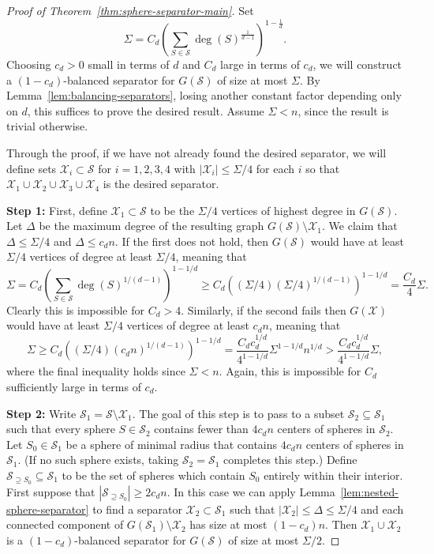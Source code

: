 \documentclass[10pt,a4paper]{amsart}
\newcommand{\fS}{\mathcal S}
\newcommand{\fX}{\mathcal X}
\newcommand{\paren}[1]{\left( #1 \right)}
\begin{document}
\begin{proof}[Proof of Theorem~\ref{thm:sphere-separator-main}]
Set \[\Sigma=C_d\paren{\sum_{S\in\fS} \deg(S)^{\tfrac1{d-1}}}^{1-\tfrac1d}.\] Choosing $c_d>0$ small in terms of $d$ and $C_d$ large in terms of $c_d$, we will construct a $(1-c_d)$-balanced separator for $G(\fS)$ of size at most $\Sigma$. By Lemma~\ref{lem:balancing-separators}, losing another constant factor depending only on $d$, this suffices to prove the desired result. Assume $\Sigma<n$, since the result is trivial otherwise.

Through the proof, if we have not already found the desired separator, we will define sets $\fX_i \subset \fS$ for $i=1,2,3,4$ with $|\fX_i| \leq \Sigma/4$ for each $i$ so that $\fX_1\cup \fX_2\cup \fX_3\cup \fX_4$ is the desired separator.

\vspace{5pt} \noindent \textbf{Step 1:}
First, define $\fX_1\subset \fS$ to be the $\Sigma/4$ vertices of highest degree in $G(\fS)$. Let $\Delta$ be the maximum degree of the resulting graph $G(\fS)\setminus\fX_1$. We claim that $\Delta\leq\Sigma/4$ and $\Delta\leq c_dn$. If the first does not hold, then $G(\fS)$ would have at least $\Sigma/4$ vertices of degree at least $\Sigma/4$, meaning that
\[\Sigma=C_d\paren{\sum_{S\in\fS} \deg(S)^{1/(d-1)}}^{1-1/d}\geq C_d\paren{(\Sigma/4)(\Sigma/4)^{1/(d-1)}}^{1-1/d}=\frac{C_d}4\Sigma.\]
Clearly this is impossible for $C_d>4$. Similarly, if the second fails then $G(\fX)$ would have at least $\Sigma/4$ vertices of degree at least $c_dn$, meaning that
\[\Sigma\geq C_d\paren{(\Sigma/4)(c_dn)^{1/(d-1)}}^{1-1/d}=\frac{C_dc_d^{1/d}}{4^{1-1/d}}\Sigma^{1-1/d}n^{1/d}>\frac{C_dc_d^{1/d}}{4^{1-1/d}}\Sigma,\]
where the final inequality holds since $\Sigma<n$. Again, this is impossible for $C_d$ sufficiently large in terms of $c_d$.

\vspace{5pt} \noindent \textbf{Step 2:} Write $\fS_1=\fS\setminus \fX_1$. The goal of this step is to pass to a subset $\fS_2\subseteq \fS_1$ such that every sphere $S\in\fS_2$ contains fewer than $4c_dn$ centers of spheres in $\fS_2$. Let $S_0\in\fS_1$ be a sphere of minimal radius that contains $4c_dn$ centers of spheres in $\fS_1$. (If no such sphere exists, taking $\fS_2=\fS_1$ completes this step.) Define $\fS_{\supseteq S_0}\subseteq \fS_1$ to be the set of spheres which contain $S_0$ entirely within their interior. First suppose that $|\fS_{\supseteq S_0}|\geq 2c_dn$. In this case we can apply Lemma~\ref{lem:nested-sphere-separator} to find a separator $\fX_2\subset\fS_1$ such that $|\fX_2|\leq\Delta\leq\Sigma/4$ and each connected component of $G(\fS_1)\setminus\fX_2$ has size at most $(1-c_d)n$. Then $\fX_1\cup\fX_2$ is a $(1-c_d)$-balanced separator for $G(\fS)$ of size at most $\Sigma/2$.


\end{proof}
\end{document}

